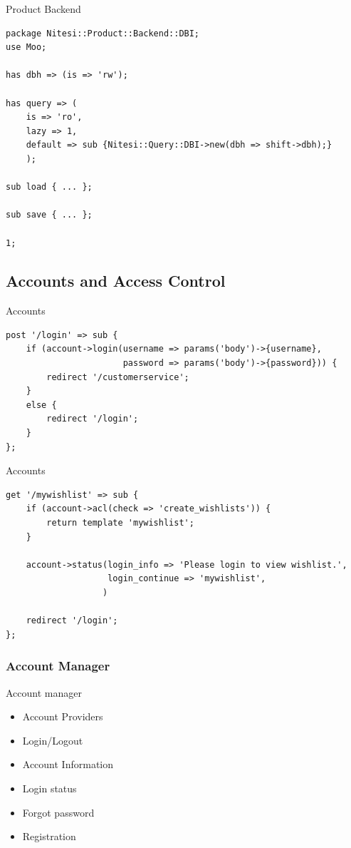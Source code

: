\begin{frame}[fragile]{Product Backend}
\begin{lstlisting}
package Nitesi::Product::Backend::DBI;
use Moo;

has dbh => (is => 'rw');

has query => (
    is => 'ro',
    lazy => 1,
    default => sub {Nitesi::Query::DBI->new(dbh => shift->dbh);}
    );

sub load { ... };

sub save { ... };

1;
\end{lstlisting}
\end{frame}

\subsection{Accounts and Access Control}

\begin{frame}[fragile]{Accounts}
\begin{lstlisting}
post '/login' => sub {
    if (account->login(username => params('body')->{username},
                       password => params('body')->{password})) {
        redirect '/customerservice';
    }
    else {
        redirect '/login';
    }
};
\end{lstlisting}
\end{frame}

\begin{frame}[fragile]{Accounts}
\begin{lstlisting}
get '/mywishlist' => sub {
    if (account->acl(check => 'create_wishlists')) {
        return template 'mywishlist';
    }

    account->status(login_info => 'Please login to view wishlist.',
                    login_continue => 'mywishlist',
                   )

    redirect '/login';
};
\end{lstlisting}
\end{frame}

\subsubsection{Account Manager}
\begin{frame}{Account manager}
\begin{itemize}
\item Account Providers
\item Login/Logout
\item Account Information
\item Login status
\item Forgot password
\item Registration
\end{itemize}
\end{frame}

